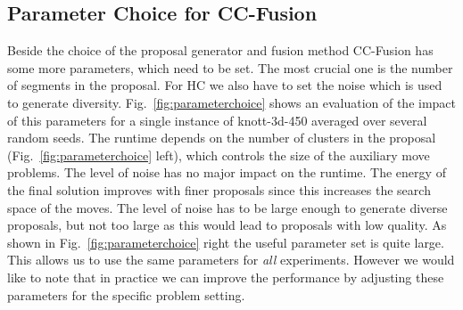 \documentclass[10pt,twocolumn,letterpaper]{article}
\theoremstyle{definition}
\begin{document}
\subsection{Parameter Choice for CC-Fusion}
Beside the choice of the proposal generator and fusion method CC-Fusion has some more parameters, which need to be set.
The most crucial one is the number of segments in the proposal. For HC we also have to set the noise which is used to generate diversity.
Fig.~\ref{fig:parameterchoice} shows an evaluation of the impact of this parameters for a single instance of knott-3d-450 averaged over several random seeds.
The runtime depends on the number of clusters in the proposal (Fig.~\ref{fig:parameterchoice} left), which controls the size of the auxiliary move problems.
The level of noise has no major impact on the runtime.
The energy of the final solution improves with finer proposals since this increases the search space of the moves.
The level of noise has to be large enough to generate diverse proposals, but not too large as this would lead to proposals with low quality.
As shown in Fig.~\ref{fig:parameterchoice} right the useful parameter set is quite large. This allows us to use the same parameters for \emph{all}
experiments. However we would like to note that in practice we can improve the performance by adjusting these parameters for the specific problem setting.
%
%
\end{document}
